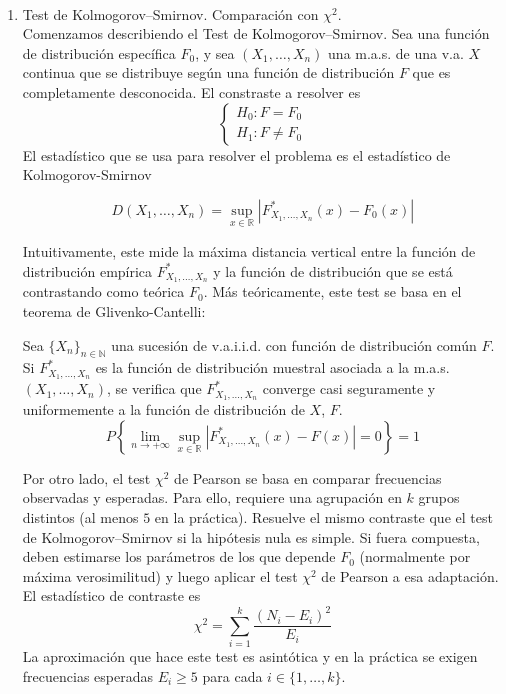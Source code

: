 \documentclass[12pt]{article}
\newcommand{\R}{\mathbb{R}}
\newcommand{\N}{\mathbb{N}}
\begin{document}
    \newpage

    \begin{ejercicio}[1.5 puntos]~
        \begin{enumerate}
            \item[a)] Test de Kolmogorov--Smirnov. Comparación con $\chi^2$. \\

            Comenzamos describiendo el Test de Kolmogorov--Smirnov. Sea una función de distribución específica $F_0$, y sea $(X_1, \ldots, X_n)$ una m.a.s. 
            de una v.a. $X$ continua que se distribuye según una función de distribución $F$ que es completamente desconocida. 
            El constraste a resolver es
            $$\begin{cases}
                H_0 : F = F_0 \\
                H_1 : F \neq F_0
            \end{cases}$$
            El estadístico que se usa para resolver el problema es el estadístico de Kolmogorov-Smirnov

            $$D(X_1, \ldots, X_n) = \sup_{x \in \R} |F_{X_1, \ldots, X_n}^{*}(x) - F_0(x)|$$

            Intuitivamente, este mide la máxima distancia vertical entre la función de distribución empírica $F_{X_1, \ldots, X_n}^{*}$ y la función de distribución que se está contrastando como teórica $F_0$.
            Más teóricamente, este test se basa en el teorema de Glivenko-Cantelli: \\

            \begin{teo}
                Sea $\{X_n\}_{n \in \N}$ una sucesión de v.a.i.i.d. con función de distribución común $F$. Si $F_{X_1, \ldots, X_n}^{*}$
                es la función de distribución muestral asociada a la m.a.s. $(X_1, \ldots, X_n)$, se verifica que $F_{X_1, \ldots, X_n}^{*}$
                converge casi seguramente y uniformemente a la función de distribución de $X$, $F$.
                $$P \left\{ \lim\limits_{n \to +\infty} \sup_{x \in \R} |F_{X_1, \ldots, X_n}^{*}(x) - F(x)| = 0 \right\} = 1$$
            \end{teo}

            Por otro lado, el test $\chi^2$ de Pearson se basa en comparar frecuencias observadas y esperadas. Para ello, requiere una agrupación en $k$ grupos distintos (al menos $5$ en la práctica).
            Resuelve el mismo contraste que el test de Kolmogorov--Smirnov si la hipótesis nula es simple. Si fuera compuesta, deben estimarse los parámetros de los que depende $F_0$ (normalmente
            por máxima verosimilitud) y luego aplicar el test $\chi^2$ de Pearson a esa adaptación. El estadístico de contraste es
            $$\chi^2 = \sum_{i=1}^{k} \dfrac{(N_i - E_i)^2}{E_i}$$
            La aproximación que hace este test es asintótica y en la práctica se exigen frecuencias esperadas $E_i \geq 5$ para cada $i \in \{1, \ldots, k\}$. \\


\end{enumerate}
\end{ejercicio}
\end{document}
